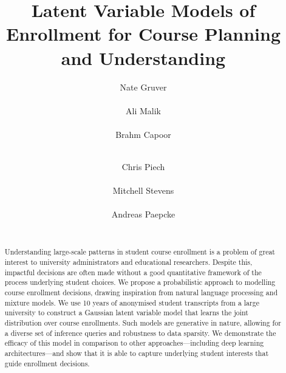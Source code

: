 \documentclass{edm_template}
\begin{document}
\title{Latent Variable Models of Enrollment for Course Planning and Understanding}

\author{
\alignauthor Nate Gruver \\
      \\
\alignauthor Ali Malik \\
      \\
\alignauthor Brahm Capoor \\
      \\
\and
\alignauthor Chris Piech\\
      \\
\alignauthor Mitchell Stevens\\
      \\
\alignauthor Andreas Paepcke \\
      \\
}


\maketitle
\begin{abstract}

Understanding large-scale patterns in student course enrollment is a problem of great interest to university administrators and educational researchers. Despite this, impactful decisions are often made without a good quantitative framework of the process underlying student choices. We propose a probabilistic approach to modelling course enrollment decisions, drawing inspiration from natural language processing and mixture models. We use 10 years of anonymised student transcripts from a large university to construct a Gaussian latent variable model that learns the joint distribution over course enrollments. Such models are generative in nature, allowing for a diverse set of inference queries and robustness to data sparsity. We demonstrate the efficacy of this model in comparison to other approaches---including deep learning architectures---and show that it is able to capture underlying student interests that guide enrollment decisions. 
\end{abstract}
\end{document}
